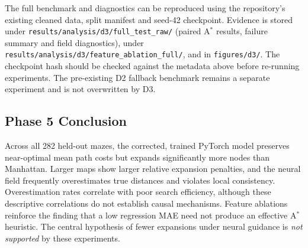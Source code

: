 The full benchmark and diagnostics can be reproduced using the repository's
existing cleaned data, split manifest and seed-42 checkpoint. Evidence is
stored under \texttt{results/analysis/d3/full\_test\_raw/} (paired A$^\ast$
results, failure summary and field diagnostics), under
\texttt{results/analysis/d3/feature\_ablation\_full/}, and in
\texttt{figures/d3/}. The checkpoint hash should be checked against the
metadata above before re-running experiments. The pre-existing D2 fallback
benchmark remains a separate experiment and is not overwritten by D3.

\subsection{Phase 5 Conclusion}
Across all 282 held-out mazes, the corrected, trained PyTorch model preserves
near-optimal mean path costs but expands significantly more nodes than
Manhattan. Larger maps show larger relative expansion penalties, and the
neural field frequently overestimates true distances and violates local
consistency. Overestimation rates correlate with poor search efficiency,
although these descriptive correlations do not establish causal mechanisms.
Feature ablations reinforce the finding that a low regression MAE need not
produce an effective A$^\ast$ heuristic. The central hypothesis of fewer
expansions under neural guidance is \emph{not supported} by these experiments.
